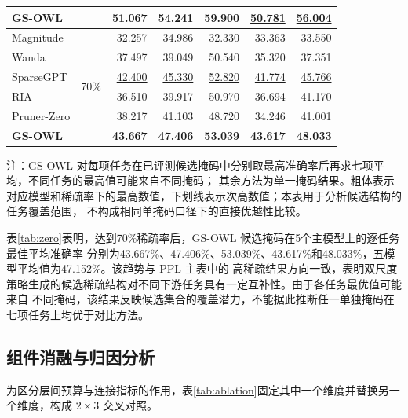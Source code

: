 \documentclass[UTF8,fontset=fandol]{ctexart}
\newcommand{\best}[1]{\textbf{#1}}
\newcommand{\second}[1]{\underline{#1}}
\begin{document}
\begin{table}[!htbp]
\begin{tabular*}{0.98\textwidth}{@{\extracolsep{\fill}}lcrrrrr@{}}
  \textbf{GS-OWL} & & \best{51.067} & \best{54.241} & \best{59.900} & \second{50.781} & \second{56.004} \\
\midrule
Magnitude & \multirow{6}{*}{70\%} & 32.257 & 34.986 & 32.330 & 33.363 & 33.550 \\
Wanda & & 37.497 & 39.049 & 50.540 & 35.320 & 37.351 \\
SparseGPT & & \second{42.400} & \second{45.330} & \second{52.820} & \second{41.774} & \second{45.766} \\
RIA & & 36.510 & 39.917 & 50.970 & 36.694 & 41.170 \\
Pruner-Zero & & 38.217 & 41.103 & 48.720 & 34.246 & 41.001 \\
\textbf{GS-OWL} & & \best{43.667} & \best{47.406} & \best{53.039} & \best{43.617} & \best{48.033} \\
\bottomrule
\end{tabular*}
\vspace{2pt}
\parbox{0.98\textwidth}{\scriptsize
注：GS-OWL 对每项任务在已评测候选掩码中分别取最高准确率后再求七项平均，不同任务的最高值可能来自不同掩码；
其余方法为单一掩码结果。粗体表示对应模型和稀疏率下的最高数值，下划线表示次高数值；本表用于分析候选结构的任务覆盖范围，
不构成相同单掩码口径下的直接优越性比较。}
\end{table}

表\ref{tab:zero}表明，达到70\%稀疏率后，GS-OWL 候选掩码在5个主模型上的逐任务最佳平均准确率
分别为43.667\%、47.406\%、53.039\%、43.617\%和48.033\%，五模型平均值为47.152\%。该趋势与 PPL 主表中的
高稀疏结果方向一致，表明双尺度策略生成的候选稀疏结构对不同下游任务具有一定互补性。由于各任务最优值可能来自
不同掩码，该结果反映候选集合的覆盖潜力，不能据此推断任一单独掩码在七项任务上均优于对比方法。

\FloatBarrier
\subsection{组件消融与归因分析}

为区分层间预算与连接指标的作用，表\ref{tab:ablation}固定其中一个维度并替换另一个维度，构成
$2\times3$ 交叉对照。
\end{document}
